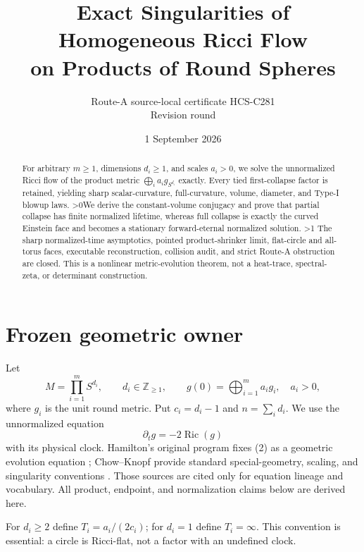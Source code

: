 \documentclass[10pt]{article}
\title{Exact Singularities of Homogeneous Ricci Flow\\
on Products of Round Spheres}
\author{Route-A source-local certificate HCS-C281\\
Revision round \CRevisionRound}
\date{1 September 2026}
\providecommand{\CRevisionRound}{2}
\newcommand{\Ric}{\operatorname{Ric}}
\begin{document}
\maketitle
\begin{abstract}
For arbitrary $m\geq1$, dimensions $d_i\geq1$, and scales $a_i>0$, we solve
the unnormalized Ricci flow of the product metric
$\bigoplus_i a_i g_{S^{d_i}}$ exactly.  Every tied first-collapse factor is
retained, yielding sharp scalar-curvature, full-curvature, volume, diameter,
and Type-I blowup laws.
\ifnum\CRevisionRound>0\space We derive the constant-volume conjugacy and
prove that partial collapse has finite normalized lifetime, whereas full
collapse is exactly the curved Einstein face and becomes a stationary
forward-eternal normalized solution.\space\fi
\ifnum\CRevisionRound>1 The sharp normalized-time asymptotics, pointed
product-shrinker limit, flat-circle and all-torus faces, executable
reconstruction, collision audit, and strict Route-A obstruction are closed.\fi
\space This is a nonlinear metric-evolution theorem, not a heat-trace,
spectral-zeta, or determinant construction.
\end{abstract}

\section{Frozen geometric owner}
Let
\[
 M=\prod_{i=1}^{m}S^{d_i},\qquad d_i\in\mathbb Z_{\geq1},
 \qquad g(0)=\bigoplus_{i=1}^{m}a_i g_i,\quad a_i>0,       \tag{1}
\]
where $g_i$ is the unit round metric.  Put $c_i=d_i-1$ and
$n=\sum_i d_i$.  We use the unnormalized equation
\begin{equation}
 \partial_tg=-2\Ric(g)                                    \tag{2}
\end{equation}
with its physical clock.  Hamilton's original program fixes (2) as a
geometric evolution equation \cite{Hamilton1982}; Chow--Knopf provide standard
special-geometry, scaling, and singularity conventions \cite{ChowKnopf2004}.
Those sources are cited only for equation lineage and vocabulary.  All
product, endpoint, and normalization claims below are derived here.

For $d_i\geq2$ define $T_i=a_i/(2c_i)$; for $d_i=1$ define
$T_i=\infty$.  This convention is essential: a circle is Ricci-flat, not a
factor with an undefined clock.
\end{document}
